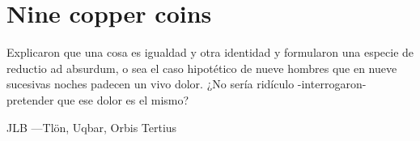 \documentclass{amsart}
\begin{document}
\section{}
\section{Nine copper coins}
\epigraph{Explicaron que una cosa es igualdad y otra identidad y formularon una especie de reductio
ad absurdum, o sea el caso hipotético de nueve hombres que en nueve sucesivas noches
padecen un vivo dolor. ¿No sería ridículo -interrogaron- pretender que ese dolor es el
mismo?}{JLB ---Tl\"on, Uqbar, Orbis Tertius}
\end{document}
